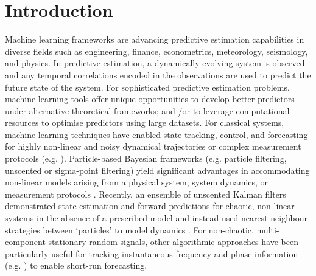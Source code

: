 \section{Introduction} 

Machine learning frameworks are advancing predictive estimation capabilities in diverse fields such as engineering, finance, econometrics, meteorology, seismology, and physics. In predictive estimation, a dynamically evolving system is observed and any temporal correlations encoded in the observations are used to predict the future state of the system. For sophisticated predictive estimation problems, machine learning tools offer unique opportunities to develop better predictors under alternative theoretical frameworks; and /or to leverage computational resources to optimise predictors using large datasets. For classical systems, machine learning techniques have enabled state tracking, control, and forecasting for highly non-linear and noisy dynamical trajectories or complex measurement protocols (e.g. \cite{garcia2016optimal, bach2004learning, tatinati2013hybrid, hall2011reinforcement, hamilton2016ensemble}). Particle-based Bayesian frameworks (e.g. particle filtering, unscented or sigma-point filtering) yield significant advantages in accommodating non-linear models arising from a physical system, system dynamics, or measurement protocols \cite{candy2016bayesian}. Recently, an ensemble of unscented Kalman filters demonstrated state estimation and forward predictions for chaotic, non-linear systems in the absence of a prescribed model and instead used nearest neighbour strategies between `particles' to model dynamics  \cite{hamilton2016ensemble}. For non-chaotic, multi-component stationary random signals, other algorithmic approaches have been particularly useful for tracking instantaneous frequency and phase information (e.g. \cite{boashash1992estimating2, ji2016gradient}) to enable short-run forecasting.  
\\
\\ 

